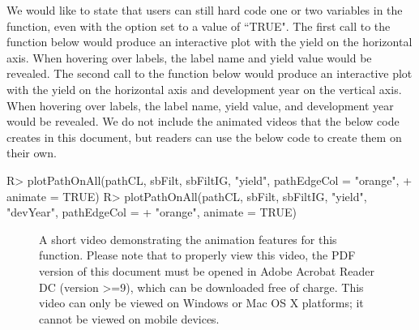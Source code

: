 \documentclass[article,shortnames]{jss}
\makeatletter
\newcommand{\mybox}[1]{%
  \setbox0=\hbox{#1}%
  \setlength{\@tempdima}{\dimexpr\wd0+13pt}%
  \begin{tcolorbox}[colframe=frameCol,colback=bgndCol,boxrule=0.5pt,arc=4pt,
      left=6pt,right=6pt,top=6pt,bottom=6pt,boxsep=0pt,width=\@tempdima]
    #1
  \end{tcolorbox}
}
\makeatother
\begin{document}
We would like to state that users can still hard code one or two variables in the  function, even with the  option set to a value of ``TRUE". The first call to the  function below would produce an interactive plot with the yield on the horizontal axis. When hovering over labels, the label name and yield value would be revealed. The second call to the  function below would produce an interactive plot with the yield on the horizontal axis and development year on the vertical axis. When hovering over labels, the label name, yield value, and development year would be revealed. We do not include the animated videos that the below code creates in this document, but readers can use the below code to create them on their own.

\begin{Code}
R> plotPathOnAll(pathCL, sbFilt, sbFiltIG, "yield", pathEdgeCol = "orange",
+    animate = TRUE)
R> plotPathOnAll(pathCL, sbFilt, sbFiltIG, "yield", "devYear", pathEdgeCol =
+    "orange", animate = TRUE)
\end{Code}

\begin{figure}[H]
    \centering
    \mediabutton[mediacommand=v1:playPause,]{\mybox{Play/Pause}}
    \caption{A short video demonstrating the animation features for this function. Please note that to properly view this video, the PDF version of this document must be opened in Adobe Acrobat Reader DC (version >=9), which can be downloaded free of charge. This video can only be viewed on Windows or Mac OS X platforms; it cannot be viewed on mobile devices.}
    \label{fig:plotAnimate}
\end{figure}
\end{document}
